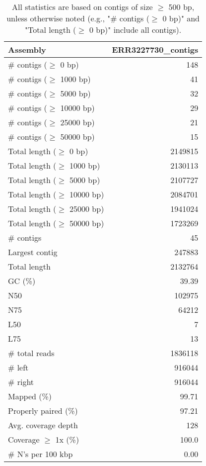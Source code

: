 \documentclass[12pt,a4paper]{article}
\begin{document}
\begin{table}[ht]
\begin{center}
\caption{All statistics are based on contigs of size $\geq$ 500 bp, unless otherwise noted (e.g., "\# contigs ($\geq$ 0 bp)" and "Total length ($\geq$ 0 bp)" include all contigs).}
\begin{tabular}{|l*{1}{|r}|}
\hline
Assembly & ERR3227730\_contigs \\ \hline
\# contigs ($\geq$ 0 bp) & 148 \\ \hline
\# contigs ($\geq$ 1000 bp) & 41 \\ \hline
\# contigs ($\geq$ 5000 bp) & 32 \\ \hline
\# contigs ($\geq$ 10000 bp) & 29 \\ \hline
\# contigs ($\geq$ 25000 bp) & 21 \\ \hline
\# contigs ($\geq$ 50000 bp) & 15 \\ \hline
Total length ($\geq$ 0 bp) & 2149815 \\ \hline
Total length ($\geq$ 1000 bp) & 2130113 \\ \hline
Total length ($\geq$ 5000 bp) & 2107727 \\ \hline
Total length ($\geq$ 10000 bp) & 2084701 \\ \hline
Total length ($\geq$ 25000 bp) & 1941024 \\ \hline
Total length ($\geq$ 50000 bp) & 1723269 \\ \hline
\# contigs & 45 \\ \hline
Largest contig & 247883 \\ \hline
Total length & 2132764 \\ \hline
GC (\%) & 39.39 \\ \hline
N50 & 102975 \\ \hline
N75 & 64212 \\ \hline
L50 & 7 \\ \hline
L75 & 13 \\ \hline
\# total reads & 1836118 \\ \hline
\# left & 916044 \\ \hline
\# right & 916044 \\ \hline
Mapped (\%) & 99.71 \\ \hline
Properly paired (\%) & 97.21 \\ \hline
Avg. coverage depth & 128 \\ \hline
Coverage $\geq$ 1x (\%) & 100.0 \\ \hline
\# N's per 100 kbp & 0.00 \\ \hline
\end{tabular}
\end{center}
\end{table}
\end{document}
